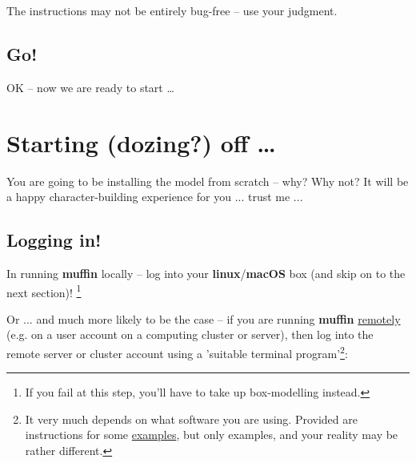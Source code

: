 \documentclass[11pt,fleqn]{book} %
\begin{document}
The instructions  may not be entirely bug-free – use your judgment.


\subsection*{Go!}

OK – now we are ready to start …


\newpage


\section{Starting (dozing?) off …}

You are going to be installing the model from scratch – why? Why not? It will be a happy character-building experience for you ... trust me ...


\subsection{Logging in!}

In running \textbf{muffin} locally -- log into your \textbf{linux}/\textbf{macOS} box (and skip on to the next section)! \footnote{If you fail at this step, you'll have to take up box-modelling instead.}

\noindent Or ... and much more likely to be the case -- if you are running \textbf{muffin} \uline{remotely} (e.g. on a user account on a computing cluster or server), then log into the remote server or cluster account using a 'suitable terminal program'\footnote{It very much depends on what software you are using. Provided are instructions for some \uline{examples}, but only examples, and your reality may be rather different.}:
\end{document}

